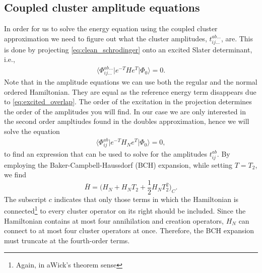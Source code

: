 \documentclass[
    a4paper, aps, twocolumn, floatfix, superscriptaddress,
    nofootinbib]{revtex4-1}
\newcommand{\1}{\mathds{1}}
\newcommand{\bra}[1]{\langle #1\lvert}
\newcommand{\ket}[1]{\rvert #1\rangle}
\newcommand{\kslat}{\ket{\Phi_0}}
\begin{document}
    \subsection{Coupled cluster amplitude equations}
        In order for us to solve the energy equation using the coupled cluster
        approximation we need to figure out what the cluster amplitudes,
        $t_{ij\dots}^{ab\dots}$, are. This is done by projecting
        \autoref{eq:clean_schrodinger} onto an excited Slater determinant, i.e.,
        \begin{align}
            \bra{\Phi_{ij\dots}^{ab\dots}}e^{-T}He^{T}\kslat
            = 0.
        \end{align}
        Note that in the amplitude equations we can use both the regular and the
        normal ordered Hamiltonian. They are equal as the reference energy term
        disappears due to \autoref{eq:excited_overlap}. The order of the
        excitation in the projection determines the order of the amplitudes you
        will find. In our case we are only interested in the second order
        ampltiudes found in the doubles approximation, hence we will solve the
        equation
        \begin{align}
            \bra{\Phi_{ij}^{ab}}e^{-T}H_N e^{T}\kslat = 0,
            \label{eq:doubles_amplitude_1}
        \end{align}
        to find an expression that can be used to solve for the amplitudes 
        $t_{ij}^{ab}$.
        By employing the Baker-Campbell-Haussdorf (BCH) expansion,
        while setting $T= T_2$, we find
        \begin{equation}
                \bar{H}
                    = \Big(
                            H_N + H_NT_2
                            + \frac{1}{2}H_NT_2^2 \Big)_C.
        \label{eq:normal_order_expansion}
        \end{equation}
        The subscript $c$ indicates that only those terms in which the
        Hamiltonian is connected\footnote{Again, in aWick's theorem sense}
        to every cluster operator on its right should be included. Since
        the Hamiltonian contains at most four annihilation and creation
        operators, $H_N$ can connect to at most four cluster operators
        at once. Therefore, the BCH expansion must truncate at the
        fourth-order terms.
\end{document}
